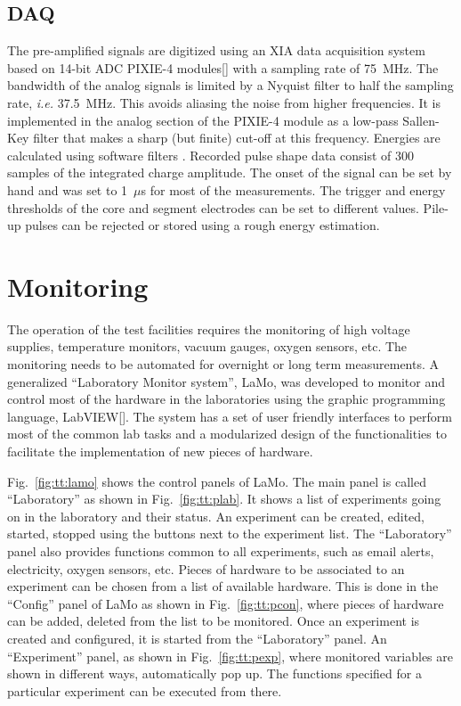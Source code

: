 \subsection{DAQ} 
\label{sec:tt:daq}
The pre-amplified signals are digitized using an XIA data acquisition system based on 14-bit ADC PIXIE-4 modules[] with a sampling rate of 75~MHz. The bandwidth of the analog signals is limited by a Nyquist filter to half the sampling rate, \textit{i.e.} 37.5~MHz. This avoids aliasing the noise from higher frequencies. It is implemented in the analog section of the PIXIE-4 module as a low-pass Sallen-Key filter that makes a sharp (but finite) cut-off at this frequency. Energies are calculated using software filters \cite{Daq06}. Recorded pulse shape data consist of 300 samples of the integrated charge amplitude. The onset of the signal can be set by hand and was set to 1~$\mu$s for most of the measurements. The trigger and energy thresholds of the core and segment electrodes can be set to different values. Pile-up pulses can be rejected or stored using a rough energy estimation.


\section{Monitoring} 
\label{sec:tt:lamo}
The operation of the test facilities requires the monitoring of high voltage supplies, temperature monitors, vacuum gauges, oxygen sensors, etc. The monitoring needs to be automated for overnight or long term measurements. A generalized ``Laboratory Monitor system'', LaMo, was developed to monitor and control most of the hardware in the laboratories using the graphic programming language, LabVIEW[]. The system has a set of user friendly interfaces to perform most of the common lab tasks and a modularized design of the functionalities to facilitate the implementation of new pieces of hardware.

Fig.~\ref{fig:tt:lamo} shows the control panels of LaMo. The main panel is called ``Laboratory'' as shown in Fig.~\ref{fig:tt:plab}. It shows a list of experiments going on in the laboratory and their status. An experiment can be created, edited, started, stopped using the buttons next to the experiment list. The ``Laboratory'' panel also provides functions common to all experiments, such as email alerts, electricity, oxygen sensors, etc. Pieces of hardware to be associated to an experiment can be chosen from a list of available hardware. This is done in the ``Config'' panel of LaMo as shown in Fig.~\ref{fig:tt:pcon}, where pieces of hardware can be added, deleted from the list to be monitored. Once an experiment is created and configured, it is started from the ``Laboratory'' panel. An ``Experiment'' panel, as shown in Fig.~\ref{fig:tt:pexp}, where monitored variables are shown in different ways, automatically pop up. The functions specified for a particular experiment can be executed from there.

